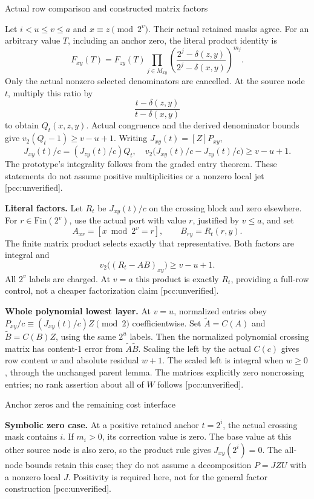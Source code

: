 \documentclass[10pt]{article}
\begin{document}
\newpage
\begin{center}{\Large Actual row comparison and constructed matrix factors}\end{center}
Let $i<u\le v\le a$ and $x\equiv z\pmod{2^v}$. Their actual retained
masks agree. For an arbitrary value $T$, including an anchor zero, the
literal product identity is
\[
 F_{xy}(T)=F_{zy}(T)\prod_{j\in M_{xy}}
 \left(\frac{2^j-\delta(z,y)}{2^j-\delta(x,y)}\right)^{m_j}.
\]
Only the actual nonzero selected denominators are cancelled.
At the source node $t$, multiply this ratio by
\[
 \frac{t-\delta(z,y)}{t-\delta(x,y)}
\]
to obtain $Q_t(x,z,y)$. Actual congruence and the derived denominator bounds
give $v_2(Q_t-1)\ge v-u+1$. Writing $J_{xy}(t)=[Z]P_{xy}$,
\[
 J_{xy}(t)/c=(J_{zy}(t)/c)Q_t,\quad
 v_2\bigl(J_{xy}(t)/c-J_{zy}(t)/c\bigr)\ge v-u+1.
\]
The prototype's integrality follows from the graded entry theorem. These
statements do not assume positive multiplicities or a nonzero local jet
[pcc:unverified].

\textbf{Literal factors.} Let $R_t$ be $J_{xy}(t)/c$ on the crossing block
and zero elsewhere. For $r\in\mathrm{Fin}(2^v)$, use the actual port with
value $r$, justified by $v\le a$, and set
\[
 A_{xr}=[x\bmod2^v=r],\qquad B_{ry}=R_t(r,y).
\]
The finite matrix product selects exactly that representative. Both factors
are integral and
\[
 v_2\bigl((R_t-AB)_{xy}\bigr)\ge v-u+1.
\]
All $2^v$ labels are charged. At $v=a$ this product is exactly $R_t$,
providing a full-row control, not a cheaper factorization claim
[pcc:unverified].

\textbf{Whole polynomial lowest layer.} At $v=u$, normalized entries obey
$P_{xy}/c\equiv (J_{xy}(t)/c)Z\pmod2$ coefficientwise. Set
$\widetilde A=C(A)$ and $\widetilde B=C(B)Z$, using the same $2^u$ labels.
Then the normalized polynomial crossing matrix has content-1 error from
$\widetilde A\widetilde B$. Scaling the left by the actual $C(c)$ gives
row content $w$ and absolute residual $w+1$. The scaled left is integral
when $w\ge0$, through the unchanged parent lemma. The matrices explicitly
zero noncrossing entries; no rank assertion about all of $W$ follows
[pcc:unverified].

\newpage
\begin{center}{\Large Anchor zeros and the remaining cost interface}\end{center}
\textbf{Symbolic zero case.} At a positive retained anchor $t=2^i$, the
actual crossing mask contains $i$. If $m_i>0$, its correction value is zero.
The base value at this other source node is also zero, so the product
rule gives $J_{xy}(2^i)=0$. The all-node bounds retain this case; they do not
assume a decomposition $P=JZU$ with a nonzero local $J$. Positivity is
required here, not for the general factor construction [pcc:unverified].
\end{document}
